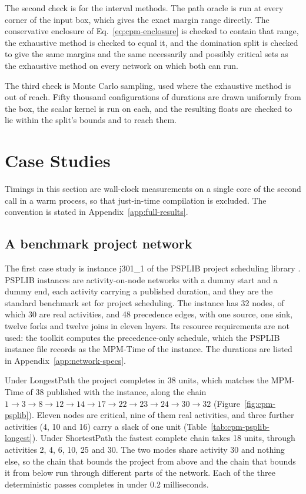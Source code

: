 \documentclass[12pt]{report}
\begin{document}
The second check is for the interval methods. The path oracle is run at every corner of
the input box, which gives the exact margin range directly. The conservative enclosure of
Eq.~\eqref{eq:cpm-enclosure} is checked to contain that range, the exhaustive method is
checked to equal it, and the domination split is checked to give the same margins and the
same necessarily and possibly critical sets as the exhaustive method on every network on
which both can run.

The third check is Monte Carlo sampling, used where the exhaustive method is out of
reach. Fifty thousand configurations of durations are drawn uniformly from the box, the
scalar kernel is run on each, and the resulting floats are checked to lie within the
split's bounds and to reach them.

\section{Case Studies}
\label{sec:cpm-cases}

Timings in this section are wall-clock measurements on a single core of the second call
in a warm process, so that just-in-time compilation is excluded. The convention is stated
in Appendix~\ref{app:full-results}.

\subsection{A benchmark project network}
\label{sec:cpm-psplib}

The first case study is instance j301\_1 of the PSPLIB project scheduling library
\cite{kolisch1997psplib}. PSPLIB instances are activity-on-node networks with a dummy start
and a dummy end, each activity carrying a published duration, and they are the standard
benchmark set for project scheduling. The instance has 32 nodes, of which 30 are real
activities, and 48 precedence edges, with one source, one sink, twelve forks and twelve
joins in eleven layers. Its resource requirements are not used: the toolkit computes the
precedence-only schedule, which the PSPLIB instance file records as the MPM-Time of the
instance. The durations are listed in Appendix~\ref{app:network-specs}.

Under LongestPath the project completes in 38 units, which matches the MPM-Time of 38
published with the instance, along the chain
$1 \to 3 \to 8 \to 12 \to 14 \to 17 \to 22 \to 23 \to 24 \to 30 \to 32$
(Figure~\ref{fig:cpm-psplib}). Eleven nodes are critical, nine of them real activities,
and three further activities (4, 10 and 16) carry a slack of one unit
(Table~\ref{tab:cpm-psplib-longest}). Under ShortestPath the fastest complete chain takes
18 units, through activities 2, 4, 6, 10, 25 and 30. The two modes share activity 30 and
nothing else, so the chain that bounds the project from above and the chain that bounds it
from below run through different parts of the network. Each of the three deterministic
passes completes in under 0.2 milliseconds.
\end{document}
